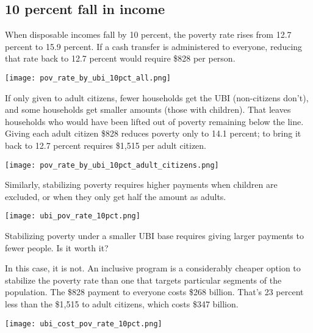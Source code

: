 \documentclass[12pt]{article}
\begin{document}
\subsection{10 percent fall in income} \label{sec:10pctfall}

When disposable incomes fall by 10 percent, the poverty rate rises from 12.7 percent to 15.9 percent. If a cash transfer is administered to everyone, reducing that rate back to 12.7 percent would require \$828 per person.

\begin{center}
\texttt{[image: pov\_rate\_by\_ubi\_10pct\_all.png]}
\label{fig:poverty}
\end{center}

If only given to adult citizens, fewer households get the UBI (non-citizens don't), and some households get smaller amounts (those with children). That leaves households who would have been lifted out of poverty remaining below the line. Giving each adult citizen \$828 reduces poverty only to 14.1 percent; to bring it back to 12.7 percent requires \$1,515 per adult citizen.

\begin{center}
\texttt{[image: pov\_rate\_by\_ubi\_10pct\_adult\_citizens.png]}
\label{fig:poverty}
\end{center}

Similarly, stabilizing poverty requires higher payments when children are excluded, or when they only get half the amount as adults.

\begin{center}
\texttt{[image: ubi\_pov\_rate\_10pct.png]}
\label{fig:poverty}
\end{center}

Stabilizing poverty under a smaller UBI base requires giving larger payments to fewer people. Is it worth it?

In this case, it is not. An inclusive program is a considerably cheaper option to stabilize the poverty rate than one that targets particular segments of the population. The \$828 payment to everyone costs \$268 billion. That’s 23 percent less than the \$1,515 to adult citizens, which costs \$347 billion.

\begin{center}
\texttt{[image: ubi\_cost\_pov\_rate\_10pct.png]}
\label{fig:poverty}
\end{center}
\end{document}

